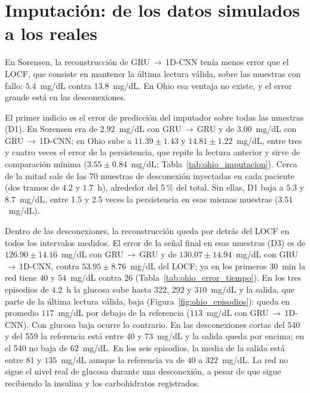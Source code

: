 \documentclass{report}
\begin{document}
\section{Imputación: de los datos simulados a los reales}
\label{sec:disc_imputacion}

En Sorensen, la reconstrucción de GRU\,$\rightarrow$\,1D-CNN tenía menos error que el LOCF, que consiste en mantener la última lectura válida, sobre las muestras con fallo: $5.4$~mg/dL contra $13.8$~mg/dL. En Ohio esa ventaja no existe, y el error grande está en las desconexiones.

El primer indicio es el error de predicción del imputador sobre todas las muestras (D1). En Sorensen era de $2.92$~mg/dL con GRU\,$\rightarrow$\,GRU y de $3.00$~mg/dL con GRU\,$\rightarrow$\,1D-CNN; en Ohio sube a $11.39 \pm 1.43$ y $14.81 \pm 1.22$~mg/dL, entre tres y cuatro veces el error de la persistencia, que repite la lectura anterior y sirve de comparación mínima ($3.55 \pm 0.84$~mg/dL; Tabla~\ref{tab:ohio_imputacion}). Cerca de la mitad sale de las 70 muestras de desconexión inyectadas en cada paciente (dos tramos de $4.2$ y $1.7$~h), alrededor del 5\,\% del total. Sin ellas, D1 baja a $5.3$ y $8.7$~mg/dL, entre 1.5 y 2.5 veces la persistencia en esas mismas muestras ($3.51$~mg/dL).

Dentro de las desconexiones, la reconstrucción queda por detrás del LOCF en todos los intervalos medidos. El error de la señal final en esas muestras (D3) es de $126.90 \pm 14.16$~mg/dL con GRU\,$\rightarrow$\,GRU y de $130.07 \pm 14.94$~mg/dL con GRU\,$\rightarrow$\,1D-CNN, contra $53.95 \pm 8.76$~mg/dL del LOCF; ya en los primeros 30~min la red tiene $40$ y $54$~mg/dL contra $26$ (Tabla~\ref{tab:ohio_error_tiempo}). En los tres episodios de $4.2$~h la glucosa sube hasta $322$, $292$ y $310$~mg/dL y la salida, que parte de la última lectura válida, baja (Figura~\ref{fig:ohio_episodios}): queda en promedio $117$~mg/dL por debajo de la referencia ($113$~mg/dL con GRU\,$\rightarrow$\,1D-CNN). Con glucosa baja ocurre lo contrario. En las desconexiones cortas del 540 y del 559 la referencia está entre $40$ y $73$~mg/dL y la salida queda por encima; en el 540 no baja de $62$~mg/dL. En los seis episodios, la media de la salida está entre $81$ y $135$~mg/dL aunque la referencia va de $40$ a $322$~mg/dL. La red no sigue el nivel real de glucosa durante una desconexión, a pesar de que sigue recibiendo la insulina y los carbohidratos registrados.
\end{document}
